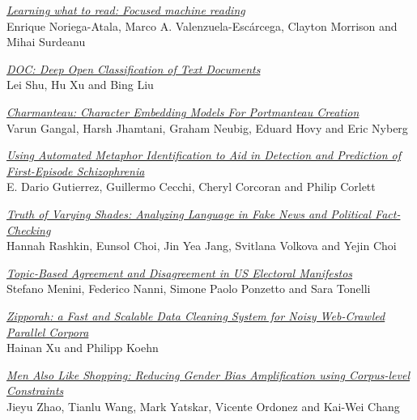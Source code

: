 \hyperlink{page.2888}{\em Learning what to read: Focused machine reading}\samepage \\
\hspace*{7mm} Enrique Noriega-Atala, Marco A. Valenzuela-Esc\'{a}rcega, Clayton Morrison and Mihai Surdeanu\dotfill {}

\hyperlink{page.2894}{\em DOC: Deep Open Classification of Text Documents}\samepage \\
\hspace*{7mm} Lei Shu, Hu Xu and Bing Liu\dotfill {}

\hyperlink{page.2900}{\em Charmanteau: Character Embedding Models For Portmanteau Creation}\samepage \\
\hspace*{7mm} Varun Gangal, Harsh Jhamtani, Graham Neubig, Eduard Hovy and Eric Nyberg\dotfill {}

\hyperlink{page.2906}{\em Using Automated Metaphor Identification to Aid in Detection and Prediction of First-Episode Schizophrenia}\samepage \\
\hspace*{7mm} E. Dario Gutierrez, Guillermo Cecchi, Cheryl Corcoran and Philip Corlett\dotfill {}

\hyperlink{page.2914}{\em Truth of Varying Shades: Analyzing Language in Fake News and Political Fact-Checking}\samepage \\
\hspace*{7mm} Hannah Rashkin, Eunsol Choi, Jin Yea Jang, Svitlana Volkova and Yejin Choi\dotfill {}

\hyperlink{page.2921}{\em Topic-Based Agreement and Disagreement in US Electoral Manifestos}\samepage \\
\hspace*{7mm} Stefano Menini, Federico Nanni, Simone Paolo Ponzetto and Sara Tonelli\dotfill {}

\hyperlink{page.2928}{\em Zipporah: a Fast and Scalable Data Cleaning System for Noisy Web-Crawled Parallel Corpora}\samepage \\
\hspace*{7mm} Hainan Xu and Philipp Koehn\dotfill {}

\hyperlink{page.2934}{\em Men Also Like Shopping: Reducing Gender Bias Amplification using Corpus-level Constraints}\samepage \\
\hspace*{7mm} Jieyu Zhao, Tianlu Wang, Mark Yatskar, Vicente Ordonez and Kai-Wei Chang\dotfill {}

